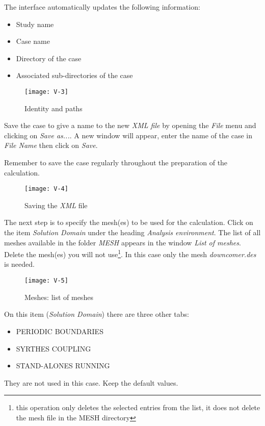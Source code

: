 \clearpage
The interface automatically updates the following information:
\begin{itemize}
        \item Study name
        \item Case name
        \item Directory of the case
        \item Associated sub-directories of the case
\end{itemize}

\begin{figure}[ht]
\begin{center}
\texttt{[image: V-3]}
\caption{Identity and paths}
\label{fig3_e1}
\end{center}
\end{figure}


\clearpage
Save the case to give a name to the new {\itshape XML file} by opening the
{\itshape File} menu and clicking on {\itshape Save as...}. A new window will
appear, enter the name of the case in {\itshape File Name} then click on
{\itshape Save}.

Remember to save the case regularly throughout the preparation of the calculation.

\begin{figure}[ht]
\begin{center}
\texttt{[image: V-4]}
\caption{Saving the {\itshape XML} file}
\label{fig4_e1}
\end{center}
\end{figure}


\clearpage
The next step is to specify the mesh(es) to be used for the calculation.
Click on the item {\itshape Solution Domain}
under the heading {\itshape Analysis environment}. The list of all
meshes available in the folder {\itshape MESH} appears in the
window {\itshape List of meshes}. Delete the mesh(es) you will not
use\footnote{this operation only deletes the selected entries from the list, it
does not delete the mesh file in the MESH directory}. In this case only the
mesh {\itshape downcomer.des} is needed.

\begin{figure}[ht]
\begin{center}
\texttt{[image: V-5]}
\caption{Meshes: list of meshes}
\label{fig5_e1}
\end{center}
\end{figure}

On this item ({\itshape Solution Domain}) there are three other tabs:
\begin{itemize}
        \item PERIODIC BOUNDARIES
        \item SYRTHES COUPLING
        \item STAND-ALONES RUNNING
\end{itemize}
They are not used in this case. Keep the default values.

